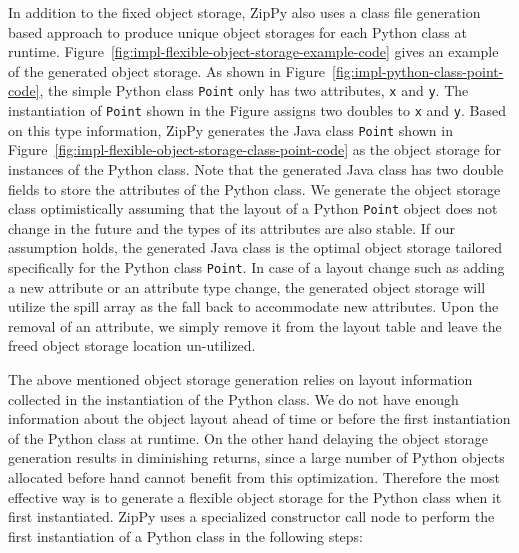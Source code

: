 In addition to the fixed object storage, ZipPy also uses a class file generation based approach to produce unique object storages for each Python class at runtime.
Figure~\ref{fig:impl-flexible-object-storage-example-code} gives an example of the generated object storage.
As shown in Figure~\ref{fig:impl-python-class-point-code}, the simple Python class \texttt{Point} only has two attributes, \texttt{x} and \texttt{y}.
The instantiation of \texttt{Point} shown in the Figure assigns two doubles to \texttt{x} and \texttt{y}.
Based on this type information, ZipPy generates the Java class \texttt{Point} shown in Figure~\ref{fig:impl-flexible-object-storage-class-point-code} as the object storage for instances of the Python class.
Note that the generated Java class has two double fields to store the attributes of the Python class.
We generate the object storage class optimistically assuming that the layout of a Python \texttt{Point} object does not change in the future and the types of its attributes are also stable.
If our assumption holds, the generated Java class is the optimal object storage tailored specifically for the Python class \texttt{Point}.
In case of a layout change such as adding a new attribute or an attribute type change, the generated object storage will utilize the spill array as the fall back to accommodate new attributes.
Upon the removal of an attribute, we simply remove it from the layout table and leave the freed object storage location un-utilized.

The above mentioned object storage generation relies on layout information collected in the instantiation of the Python class.
We do not have enough information about the object layout ahead of time or before the first instantiation of the Python class at runtime.
On the other hand delaying the object storage generation results in diminishing returns, since a large number of Python objects allocated before hand cannot benefit from this optimization.
Therefore the most effective way is to generate a flexible object storage for the Python class when it first instantiated.
ZipPy uses a specialized constructor call node to perform the first instantiation of a Python class in the following steps:

